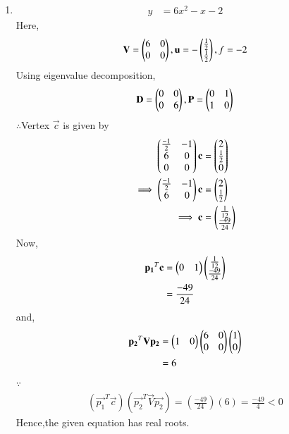 \begin{enumerate}
    \item
    \begin{align}
        y &= 6x^2-x-2
    \end{align}
    Here,
    \begin{align}
        \mathbf{V} = \begin{pmatrix}6 & 0 \\ 0 & 0\end{pmatrix},\mathbf{u}=-\begin{pmatrix}\frac{1}{2} \\ \frac{1}{2}\end{pmatrix},f=-2
    \end{align}
    Using eigenvalue decomposition,
    \begin{align}
        \mathbf{D} = \begin{pmatrix}0 & 0\\0 & 6\end{pmatrix} ,\mathbf{P}=\begin{pmatrix}0 & 1\\1 & 0\end{pmatrix}
    \end{align}
    $\therefore$Vertex $\vec{c}$ is given by
    \begin{align}
        \begin{pmatrix}\frac{-1}{2} & -1 \\ 6 & 0 \\ 0 & 0\end{pmatrix}\mathbf{c} &= \begin{pmatrix}2 \\ \frac{1}{2} \\ 0\end{pmatrix} \\
        \implies  \begin{pmatrix}\frac{-1}{2} & -1 \\ 6 & 0\end{pmatrix}\mathbf{c} &= \begin{pmatrix}2 \\ \frac{1}{2}\end{pmatrix}
        \\
        \implies \mathbf{c} &= \begin{pmatrix}\frac{1}{12} \\ \frac{-49}{24}\end{pmatrix}
    \end{align}
    Now,
    \begin{align}
        \mathbf{p_1}^T\mathbf{c} &= \begin{pmatrix}0 & 1\end{pmatrix}\begin{pmatrix}\frac{1}{12} \\ \frac{-49}{24}\end{pmatrix}
        \\
        &= \frac{-49}{24}
    \end{align}
    and,
    \begin{align}
        \mathbf{p_2}^T\mathbf{V}\mathbf{p_2} &= \begin{pmatrix}1 & 0\end{pmatrix}\begin{pmatrix}6 & 0\\0& 0\end{pmatrix}\begin{pmatrix}1 \\ 0\end{pmatrix}
        \\
        &= 6
    \end{align}
    $\because$
    \begin{align}
    (\vec{p_1}^T\vec{c})(\vec{p_2}^T\vec{V}\vec{p_2}) = (\frac{-49}{24})(6) = \frac{-49}{4}<0
    \end{align}
    Hence,the given equation has real roots.
    

\end{enumerate}
